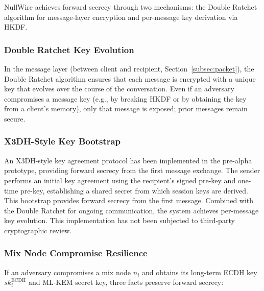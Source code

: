 \documentclass[11pt]{article}
\theoremstyle{definition}
\theoremstyle{remark}
\begin{document}
NullWire achieves forward secrecy through two mechanisms: the Double Ratchet algorithm for message-layer encryption and per-message key derivation via HKDF.

\subsubsection{Double Ratchet Key Evolution}

In the message layer (between client and recipient, Section~\ref{subsec:packet}), the Double Ratchet algorithm ensures that each message is encrypted with a unique key that evolves over the course of the conversation. Even if an adversary compromises a message key (e.g., by breaking HKDF or by obtaining the key from a client's memory), only that message is exposed; prior messages remain secure.

\subsubsection{X3DH-Style Key Bootstrap}

An X3DH-style key agreement protocol has been implemented in the pre-alpha prototype, providing forward secrecy from the first message exchange. The sender performs an initial key agreement using the recipient's signed pre-key and one-time pre-key, establishing a shared secret from which session keys are derived. This bootstrap provides forward secrecy from the first message. Combined with the Double Ratchet for ongoing communication, the system achieves per-message key evolution. This implementation has not been subjected to third-party cryptographic review.

\subsubsection{Mix Node Compromise Resilience}

If an adversary compromises a mix node $n_i$ and obtains its long-term ECDH key $sk_i^{\text{ECDH}}$ and ML-KEM secret key, three facts preserve forward secrecy:
\end{document}
